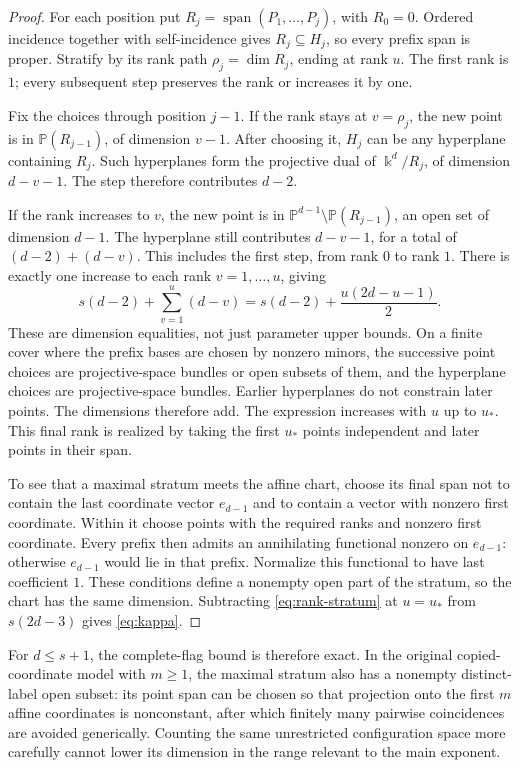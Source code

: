 \documentclass[11pt,a4paper]{article}
\newcommand{\PP}{\mathbb P}
\DeclareMathOperator{\spanop}{span}
\theoremstyle{definition}
\theoremstyle{remark}
\numberwithin{equation}{section}
\begin{document}
\begin{proof}
For each position put $R_j=\spanop(P_1,\ldots,P_j)$, with $R_0=0$. Ordered incidence together with self-incidence gives $R_j\subseteq H_j$, so every prefix span is proper. Stratify by its rank path $\rho_j=\dim R_j$, ending at rank $u$. The first rank is $1$; every subsequent step preserves the rank or increases it by one.

Fix the choices through position $j-1$. If the rank stays at $v=\rho_j$, the new point is in $\PP(R_{j-1})$, of dimension $v-1$. After choosing it, $H_j$ can be any hyperplane containing $R_j$. Such hyperplanes form the projective dual of $\Bbbk^d/R_j$, of dimension $d-v-1$. The step therefore contributes $d-2$.

If the rank increases to $v$, the new point is in $\PP^{d-1}\setminus\PP(R_{j-1})$, an open set of dimension $d-1$. The hyperplane still contributes $d-v-1$, for a total of $(d-2)+(d-v)$. This includes the first step, from rank $0$ to rank $1$. There is exactly one increase to each rank $v=1,\ldots,u$, giving
\begin{equation}\label{eq:rank-stratum}
s(d-2)+\sum_{v=1}^u(d-v)=s(d-2)+\frac{u(2d-u-1)}2.
\end{equation}
These are dimension equalities, not just parameter upper bounds. On a finite cover where the prefix bases are chosen by nonzero minors, the successive point choices are projective-space bundles or open subsets of them, and the hyperplane choices are projective-space bundles. Earlier hyperplanes do not constrain later points. The dimensions therefore add. The expression increases with $u$ up to $u_*$. This final rank is realized by taking the first $u_*$ points independent and later points in their span.

To see that a maximal stratum meets the affine chart, choose its final span not to contain the last coordinate vector $e_{d-1}$ and to contain a vector with nonzero first coordinate. Within it choose points with the required ranks and nonzero first coordinate. Every prefix then admits an annihilating functional nonzero on $e_{d-1}$: otherwise $e_{d-1}$ would lie in that prefix. Normalize this functional to have last coefficient $1$. These conditions define a nonempty open part of the stratum, so the chart has the same dimension. Subtracting \eqref{eq:rank-stratum} at $u=u_*$ from $s(2d-3)$ gives \eqref{eq:kappa}.
\end{proof}

For $d\le s+1$, the complete-flag bound is therefore exact. In the original copied-coordinate model with $m\ge1$, the maximal stratum also has a nonempty distinct-label open subset: its point span can be chosen so that projection onto the first $m$ affine coordinates is nonconstant, after which finitely many pairwise coincidences are avoided generically. Counting the same unrestricted configuration space more carefully cannot lower its dimension in the range relevant to the main exponent.
\end{document}
